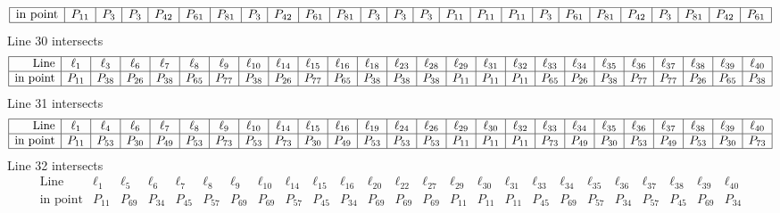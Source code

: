 \documentclass{article}
\begin{document}
{$$\begin{array}{|r*{24}{|c}|}
\hline
\mbox{in point}  & P_{11} & P_{3} & P_{3} & P_{42} & P_{61} & P_{81} & P_{3} & P_{42} & P_{61} & P_{81} & P_{3} & P_{3} & P_{3} & P_{11} & P_{11} & P_{11} & P_{3} & P_{61} & P_{81} & P_{42} & P_{3} & P_{81} & P_{42} & P_{61}\\
\hline
\end{array}
$$
Line 30 intersects 
$$
\begin{array}{|r*{24}{|c}|}
\hline
\mbox{Line}  & \ell_{1} & \ell_{3} & \ell_{6} & \ell_{7} & \ell_{8} & \ell_{9} & \ell_{10} & \ell_{14} & \ell_{15} & \ell_{16} & \ell_{18} & \ell_{23} & \ell_{28} & \ell_{29} & \ell_{31} & \ell_{32} & \ell_{33} & \ell_{34} & \ell_{35} & \ell_{36} & \ell_{37} & \ell_{38} & \ell_{39} & \ell_{40}\\
\hline
\mbox{in point}  & P_{11} & P_{38} & P_{26} & P_{38} & P_{65} & P_{77} & P_{38} & P_{26} & P_{77} & P_{65} & P_{38} & P_{38} & P_{38} & P_{11} & P_{11} & P_{11} & P_{65} & P_{26} & P_{38} & P_{77} & P_{77} & P_{26} & P_{65} & P_{38}\\
\hline
\end{array}
$$
Line 31 intersects 
$$
\begin{array}{|r*{24}{|c}|}
\hline
\mbox{Line}  & \ell_{1} & \ell_{4} & \ell_{6} & \ell_{7} & \ell_{8} & \ell_{9} & \ell_{10} & \ell_{14} & \ell_{15} & \ell_{16} & \ell_{19} & \ell_{24} & \ell_{26} & \ell_{29} & \ell_{30} & \ell_{32} & \ell_{33} & \ell_{34} & \ell_{35} & \ell_{36} & \ell_{37} & \ell_{38} & \ell_{39} & \ell_{40}\\
\hline
\mbox{in point}  & P_{11} & P_{53} & P_{30} & P_{49} & P_{53} & P_{73} & P_{53} & P_{73} & P_{30} & P_{49} & P_{53} & P_{53} & P_{53} & P_{11} & P_{11} & P_{11} & P_{73} & P_{49} & P_{30} & P_{53} & P_{49} & P_{53} & P_{30} & P_{73}\\
\hline
\end{array}
$$
Line 32 intersects 
$$
\begin{array}{|r*{24}{|c}|}
\hline
\mbox{Line}  & \ell_{1} & \ell_{5} & \ell_{6} & \ell_{7} & \ell_{8} & \ell_{9} & \ell_{10} & \ell_{14} & \ell_{15} & \ell_{16} & \ell_{20} & \ell_{22} & \ell_{27} & \ell_{29} & \ell_{30} & \ell_{31} & \ell_{33} & \ell_{34} & \ell_{35} & \ell_{36} & \ell_{37} & \ell_{38} & \ell_{39} & \ell_{40}\\
\hline
\mbox{in point}  & P_{11} & P_{69} & P_{34} & P_{45} & P_{57} & P_{69} & P_{69} & P_{57} & P_{45} & P_{34} & P_{69} & P_{69} & P_{69} & P_{11} & P_{11} & P_{11} & P_{45} & P_{69} & P_{57} & P_{34} & P_{57} & P_{45} & P_{69} & P_{34}\\

\end{array}$$}
\end{document}

